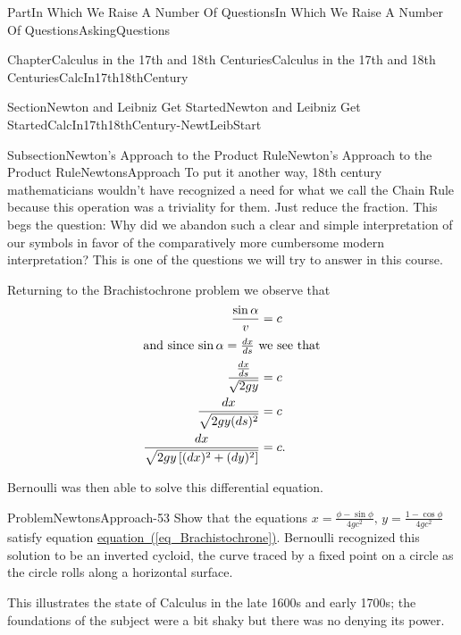 \documentclass[oneside,10pt,]{book}
\newcommand{\xreffont}{\relax}
\numberwithin{equation}{part}
\newcommand{\dx}[1]{\,{\rm d}#1}
\newcommand{\amp}{&}
\begin{document}
\begin{partptx}{Part}{In Which We Raise A Number Of Questions}{}{In Which We Raise A Number Of Questions}{}{}{AskingQuestions}
\begin{chapterptx}{Chapter}{Calculus in the 17th and 18th Centuries}{}{Calculus in the 17th and 18th Centuries}{}{}{CalcIn17th18thCentury}
\begin{sectionptx}{Section}{Newton and Leibniz Get Started}{}{Newton and Leibniz Get Started}{}{}{CalcIn17th18thCentury-NewtLeibStart}
\begin{subsectionptx}{Subsection}{Newton's Approach to the Product Rule}{}{Newton's Approach to the Product Rule}{}{}{NewtonsApproach}
To put it another way, 18th century mathematicians wouldn't have recognized a need for what we call the Chain Rule because this operation was a triviality for them.  Just reduce the fraction.  This begs the question: Why did we abandon such a clear and simple interpretation of our symbols in favor of the comparatively more cumbersome modern interpretation?  This is one of the questions we will try to answer in this course.%
\par
Returning to the Brachistochrone problem we observe that%
\begin{align}
\frac{\sin\alpha}{v} \amp = c\notag\\
\intertext{and since \(\sin\alpha = \frac{d x}{d s}\)   we see that}
\frac{\frac{d x}{d s}}{\sqrt{2gy}} \amp = c\notag\\
\frac{d x}{\sqrt{2gy(ds)^2}} \amp = c\notag\\
\frac{d x}{\sqrt{2gy\left[(d x)^2+(d y)^2\right]}} \amp = c\text{.}\label{eq_Brachistochrone}
\end{align}
%
\par
Bernoulli was then able to solve this differential equation.%
\begin{problem}{Problem}{}{NewtonsApproach-53}%
Show that the equations \(x=\frac{\phi-\sin
\phi}{4gc^2},\,y=\frac{1-\cos \phi}{4gc^2}\) satisfy equation \hyperref[eq_Brachistochrone]{equation~({\xreffont\ref{eq_Brachistochrone}})}. Bernoulli recognized this solution to be an inverted cycloid, the curve traced by a fixed point on a circle as the circle rolls along a horizontal surface.%
\end{problem}
This illustrates the state of Calculus in the late 1600s and early 1700s; the foundations of the subject were a bit shaky but there was no denying its power.%
\end{subsectionptx}
\end{sectionptx}
%
%
\typeout{************************************************}
\typeout{************************************************}
%
\end{chapterptx}
\end{partptx}
\end{document}
